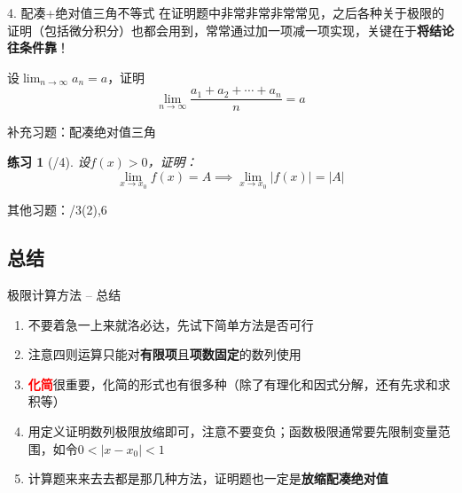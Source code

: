 \documentclass[UTF8]{ctexbeamer}
\newtheorem{exercise}[theorem]{练习} %
\begin{document}
\begin{frame}{4. 配凑+绝对值三角不等式}
在证明题中非常非常非常常见，之后各种关于极限的证明（包括微分积分）也都会用到，常常通过加一项减一项实现，关键在于\textbf{将结论往条件靠}！
\begin{example}[\textsection 3.2/16]
设$\displaystyle\lim_{n\to\infty}a_n=a$，证明
\[\lim_{n\to\infty}\frac{a_1+a_2+\cdots+a_n}{n}=a\]
\end{example}
\end{frame}

\begin{frame}{补充习题：配凑绝对值三角}
\begin{exercise}[/4]
设$f(x)>0$，证明：
\[\lim_{x\to x_0}f(x)=A\implies\lim_{x\to x_0}|f(x)|=|A|\]
\end{exercise}
其他习题：/3(2),6
\end{frame}

\subsection{总结}
\begin{frame}{极限计算方法 -- 总结}
\begin{enumerate}
	\item<1-> 不要着急一上来就洛必达，先试下简单方法是否可行
	\item<2-> 注意四则运算只能对\textbf{有限项}且\textbf{项数固定}的数列使用
	\item<3-> \textcolor{red}{\textbf{化简}}很重要，化简的形式也有很多种（除了有理化和因式分解，还有先求和求积等）
	\item<4-> 用定义证明数列极限放缩即可，注意不要变负；函数极限通常要先限制变量范围，如令$0<|x-x_0|<1$
	\item<5-> 计算题来来去去都是那几种方法，证明题也一定是\textbf{放缩配凑绝对值}
\end{enumerate}
\end{frame}
\end{document}

